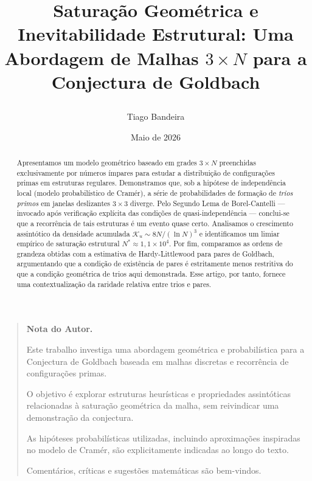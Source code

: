 \documentclass{article}
\title{%
	
	Saturação Geométrica e Inevitabilidade Estrutural: Uma Abordagem de Malhas $3 \times N$ para a Conjectura de Goldbach
	
}
\author{Tiago Bandeira}
\date{Maio de 2026}
\begin{document}
	
	\maketitle
	
	\begin{abstract}
		Apresentamos um modelo geométrico baseado em grades $3 \times N$
		preenchidas exclusivamente por números ímpares para estudar a
		distribuição de configurações primas em estruturas regulares.
		Demonstramos que, sob a hipótese de independência local (modelo
		probabilístico de Cramér), a série de probabilidades de formação
		de \emph{trios primos} em janelas deslizantes $3 \times 3$ diverge.
		Pelo Segundo Lema de Borel-Cantelli — invocado após verificação
		explícita das condições de quasi-independência — conclui-se que a
		recorrência de tais estruturas é um evento quase certo.
		Analisamos o crescimento assintótico da densidade acumulada
		$\mathcal{K}_u \sim 8N/(\ln N)^{3}$ e identificamos um limiar
		empírico de saturação estrutural $N^{*} \approx 1{,}1 \times 10^{4}$.
		Por fim, comparamos as ordens de grandeza obtidas com a estimativa
		de Hardy-Littlewood para pares de Goldbach, argumentando que a
		condição de existência de pares é estritamente menos restritiva do
		que a condição geométrica de trios aqui demonstrada. Esse artigo, por tanto, fornece uma contextualização da raridade relativa entre trios e pares.
	\end{abstract}
	
	\begin{quote}
		\textbf{Nota do Autor.}
		
		Este trabalho investiga uma abordagem geométrica e probabilística para a Conjectura de Goldbach baseada em malhas discretas e recorrência de configurações primas.
		
		O objetivo é explorar estruturas heurísticas e propriedades assintóticas relacionadas à saturação geométrica da malha, sem reivindicar uma demonstração da conjectura.
		
		As hipóteses probabilísticas utilizadas, incluindo aproximações inspiradas no modelo de Cramér, são explicitamente indicadas ao longo do texto.
		
		Comentários, críticas e sugestões matemáticas são bem-vindos.
	\end{quote}
	
	\tableofcontents
	\vspace{1cm}
	
\end{document}
